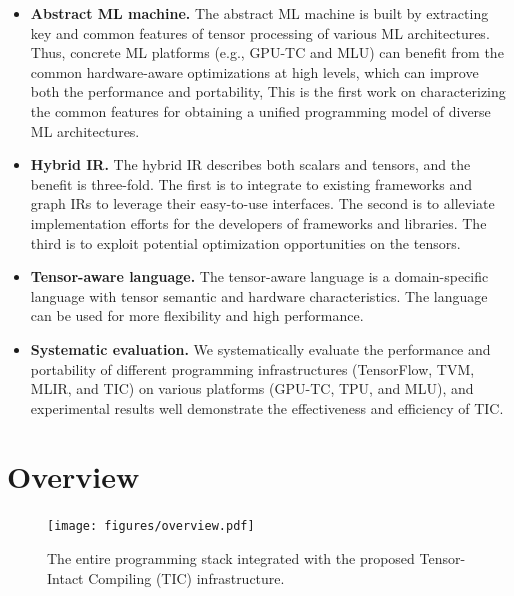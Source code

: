 \begin{itemize}
\vspace{-7pt}
\item \textbf{Abstract ML machine.} The abstract ML machine is built by extracting key and common features of tensor processing of various ML architectures. Thus, concrete ML platforms (e.g., GPU-TC and MLU) can benefit from the common hardware-aware optimizations at high levels, which can improve both the performance and portability, This is the first work on characterizing the common features for obtaining a unified programming model of diverse ML architectures.

\vspace{-7pt}
\item \textbf{Hybrid IR.} The hybrid IR describes both scalars and tensors, and the benefit is three-fold. The first is to integrate to existing frameworks and graph IRs to leverage their easy-to-use interfaces. The second is to alleviate implementation efforts for the developers of frameworks and libraries. The third is to exploit potential optimization opportunities on the tensors.

\vspace{-7pt}
\item \textbf{Tensor-aware language.} The tensor-aware language is a domain-specific language with tensor semantic and hardware characteristics. The language can be used for more flexibility and high performance.

\vspace{-7pt}
\item \textbf{Systematic evaluation.} We systematically evaluate the performance and portability of different programming infrastructures (TensorFlow, TVM, MLIR, and TIC) on various platforms (GPU-TC, TPU, and MLU), and experimental results well demonstrate the effectiveness and efficiency of TIC.


\end{itemize}


\section{Overview}\label{sec:overview}

\begin{figure}
\vspace{-10pt}
\centering
\texttt{[image: figures/overview.pdf]}
\vspace{-10pt}
\caption{\footnotesize The entire programming stack integrated with the proposed Tensor-Intact Compiling (TIC) infrastructure.}
\label{fig:overview}
\vspace{-15pt}
\end{figure}

